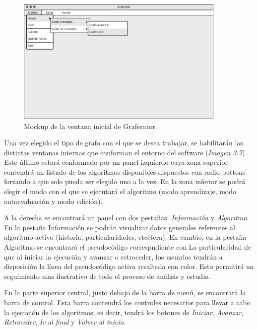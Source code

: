 \documentclass{book}
\begin{document}
\begin{figure}[H]
	\centering
	\includegraphics[width=0.9\textwidth]{images/02-01.png}
	\medskip
	\caption{Mockup de la ventana inicial de Graferator}
	\medskip
\end{figure}
\bigskip

Una vez elegido el tipo de grafo con el que se desea trabajar, se habilitarán las distintas ventanas internas que conforman el entorno del software (\textit{Imagen 3.7}). Este último estará conformado por un panel izquierdo cuya zona superior contendrá un listado de los algoritmos disponibles dispuestos con radio buttons forzando a que solo pueda ser elegido uno a la vez. En la zona inferior se podrá elegir el modo con el que se ejecutará el algoritmo (modo aprendizaje, modo autoevaluación y modo edición).
\par
A la derecha se encontrará un panel con dos pestañas: \textit{Información} y \textit{Algoritmo}. En la pestaña Información se podrán visualizar datos generales referentes al algoritmo activo (historia, particularidades, etcétera). En cambio, en la pestaña Algoritmo se encontrará el pseudocódigo correspndiente con La particularidad de que al iniciar la ejecución y avanzar o retroceder, los usuarios tendrán a disposición la línea del pseudocódigo activa resaltada con color. Esto permitirá un seguimiento mas ilustrativo de todo el proceso de análisis y estudio.
\par
En la parte superior central, justo debajo de la barra de menú, se encontrará la barra de control. Esta barra contendrá los controles necesarios para llevar a cabo la ejecución de los algoritmos, es decir, tendrá los botones de \textit{Iniciar}, \textit{Avanzar}, \textit{Retroceder}, \textit{Ir al final} y \textit{Volver al inicio}.
\bigskip
\end{document}
